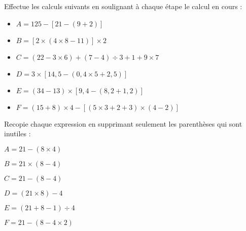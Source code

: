 \begin{exercice}
Effectue les calculs suivants en soulignant à chaque étape le calcul en cours :
\begin{itemize}
 \item $A = 125 - [21 - (9 + 2)]$
 
 \dotfill		

 \dotfill
 
 \dotfill

\vspace*{5em}


 \item $B = [2 \times (4 \times 8 - 11)] \times 2$	

 \dotfill	

 \dotfill

 \dotfill
	
 \item $C = (22 - 3 \times 6) + (7 - 4) \div 3 + 1 + 9 \times 7$  	

 \dotfill	

 \dotfill	

 \dotfill

 \dotfill
 
 \dotfill
	
 \item $D = 3 \times [14,5 - (0,4 \times 5 + 2,5)]$
	
 \dotfill		

 \dotfill

 \dotfill

 \dotfill
	
 \item $E = (34 - 13) \times [9,4 - (8,2 + 1,2)]$

 \dotfill

 \dotfill

 \dotfill

 \dotfill
	
 \item $F = (15 + 8) \times 4 - [(5 \times 3 + 2 + 3) \times (4 - 2)]$
 
 \dotfill	

 \dotfill
 
 \dotfill

 \dotfill
 \end{itemize}
\end{exercice}

\begin{exercice}
Recopie chaque expression en supprimant seulement les parenthèses qui sont inutiles :

$A = 21 - ( 8 \times 4 )$ \dotfill

$B = 21 \times ( 8 - 4 )$ \dotfill

$C = 21 - ( 8 - 4 )$ \dotfill

$D = ( 21 \times 8 ) - 4$ \dotfill

$E = ( 21 + 8 - 1 ) \div 4$  \dotfill

$F = 21 - ( 8 - 4 \times 2 )$ \dotfill
\end{exercice}


